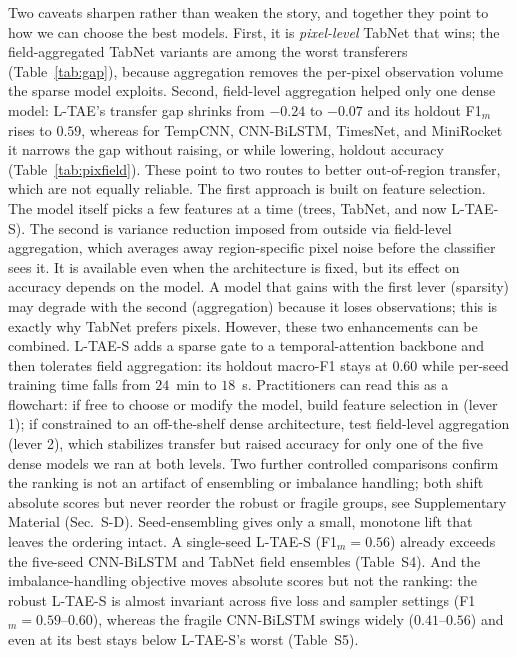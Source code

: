 \documentclass[preprint,authoryear]{elsarticle}
\begin{document}
Two caveats sharpen rather than weaken the story, and together they point to how we can choose the best models. First, it is \emph{pixel-level} TabNet that wins; the field-aggregated TabNet variants are among the worst transferers (Table~\ref{tab:gap}), because aggregation removes the per-pixel observation volume the sparse model exploits. Second, field-level aggregation helped only one dense model: L-TAE's transfer gap shrinks from $-0.24$ to $-0.07$ and its holdout F1$_m$ rises to $0.59$, whereas for TempCNN, CNN-BiLSTM, TimesNet, and MiniRocket it narrows the gap without raising, or while lowering, holdout accuracy (Table~\ref{tab:pixfield}). These point to two routes to better out-of-region transfer, which are not equally reliable. The first approach is built on feature selection. The model itself picks a few features at a time (trees, TabNet, and now L-TAE-S). The second is variance reduction imposed from outside via field-level aggregation, which averages away region-specific pixel noise before the classifier sees it. It is available even when the architecture is fixed, but its effect on accuracy depends on the model. A model that gains with the first lever (sparsity) may degrade with the second (aggregation) because it loses observations; this is exactly why TabNet prefers pixels. However, these two enhancements can be combined. L-TAE-S adds a sparse gate to a temporal-attention backbone and then tolerates field aggregation: its holdout macro-F1 stays at $0.60$ while per-seed training time falls from $24$~min to $18$~s. Practitioners can read this as a flowchart: if free to choose or modify the model, build feature selection in (lever 1); if constrained to an off-the-shelf dense architecture, test field-level aggregation (lever 2), which stabilizes transfer but raised accuracy for only one of the five dense models we ran at both levels. Two further controlled comparisons confirm the ranking is not an artifact of ensembling or imbalance handling; both shift absolute scores but never reorder the robust or fragile groups, see Supplementary Material (Sec.~S-D). Seed-ensembling gives only a small, monotone lift that leaves the ordering intact. A single-seed L-TAE-S (F1$_m=0.56$) already exceeds the five-seed CNN-BiLSTM and TabNet field ensembles (Table~S4). And the imbalance-handling objective moves absolute scores but not the ranking: the robust L-TAE-S is almost invariant across five loss and sampler settings (F1$_m=0.59$--$0.60$), whereas the fragile CNN-BiLSTM swings widely ($0.41$--$0.56$) and even at its best stays below L-TAE-S's worst (Table~S5).
\end{document}
